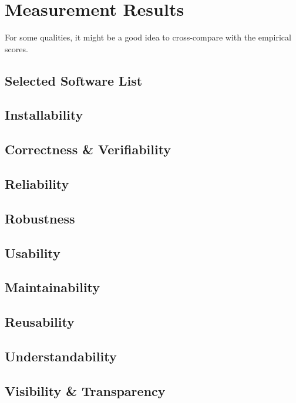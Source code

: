 \chapter{Measurement Results}
\label{ch_results}

For some qualities, it might be a good idea to cross-compare with the empirical scores.

\section{Selected Software List}

\section{Installability}

\section{Correctness \& Verifiability}

\section{Reliability}

\section{Robustness}

\section{Usability}

\section{Maintainability}

\section{Reusability}

\section{Understandability}

\section{Visibility \& Transparency}
